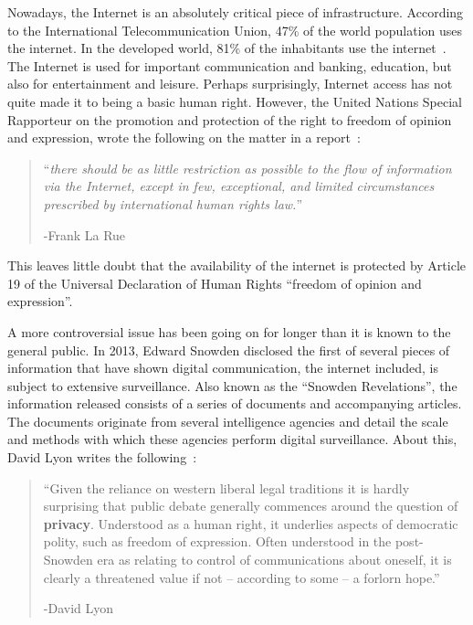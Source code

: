 \documentclass[a4paper,11pt]{book}
\theoremstyle{definition}
\begin{document}
Nowadays, the Internet is an absolutely critical piece of infrastructure. According
to the International Telecommunication Union, 47\% of the world population uses the internet.
In the developed world, 81\% of the inhabitants use the internet~\cite{itu2016facts}.
The Internet is used for important communication and banking, education, but also for entertainment and
leisure. Perhaps surprisingly, Internet access has not quite
made it to being a basic human right. However, the United Nations Special Rapporteur
on the promotion and protection of the right to freedom of opinion and expression, wrote
the following on the matter in a report~\cite{larue2011report}:

\begin{quote}
    ``\textit{there should be as little restriction as possible  to  the  flow  of  information  via  the  Internet,
    except  in  few,  exceptional,  and  limited  circumstances  prescribed  by  international  human  rights  law.}'' 
    
    -Frank La Rue  
\end{quote}

This leaves little doubt that the availability of the internet is protected by Article 19 of
the Universal Declaration of Human Rights ``freedom of opinion and expression''\cite{assembly1948universal}.

A more controversial issue has been going on for longer than it is known to the general public.
In 2013, Edward Snowden disclosed the first of several pieces of information that
have shown digital communication, the internet included, is subject to extensive surveillance.
Also known as the ``Snowden Revelations'', the information released consists of a series
of documents and accompanying articles. The documents originate from several intelligence 
agencies and detail the scale and methods with which these agencies perform digital
surveillance. 
About this, David Lyon writes the following~\cite{lyon2014surveillance}:

\begin{quote}
    ``Given the reliance on western liberal legal traditions
    it is hardly surprising that public debate generally 
    commences around the question of \textbf{privacy}.
    Understood as a human right, it underlies aspects of democratic polity,
    such as freedom of expression. 
    Often understood in the post-Snowden era as relating to 
    control of communications about oneself, 
    it is clearly a threatened value if not – according to some – a forlorn hope.''

    -David Lyon
\end{quote}
\end{document}
